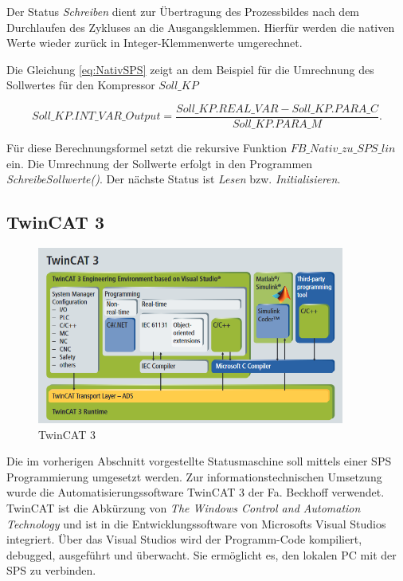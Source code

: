 Der Status \textit{Schreiben} dient zur Übertragung des Prozessbildes  nach dem Durchlaufen des Zykluses an die Ausgangsklemmen. Hierfür werden die nativen Werte wieder zurück in Integer-Klemmenwerte umgerechnet.

Die Gleichung \ref{eq:NativSPS} zeigt an dem Beispiel für die Umrechnung des Sollwertes für den Kompressor $Soll\_KP$

\begin{equation}
Soll\_KP.INT\_VAR\_Output = \frac{Soll\_KP.REAL\_VAR - Soll\_KP.PARA\_C}{Soll\_KP.PARA\_M}.
\label{eq:NativSPS} 
\end{equation}

Für diese Berechnungsformel setzt \textsc{\citeauthor{Nuerenberg2015}} die rekursive Funktion $FB\_Nativ\_zu\_SPS\_lin$ ein. Die Umrechnung der Sollwerte erfolgt in den Programmen \textit{SchreibeSollwerte()}. Der nächste Status ist \textit{Lesen} bzw. \textit{Initialisieren}.

\subsection{TwinCAT 3}
\label{subsec:TwinCat}

\begin{figure}[htb]
\centering		\includegraphics[width=0.90\textwidth]{Pictures/TwinCat3_Beckhoff.png}
\caption{TwinCAT 3 \citep{Beckhoff2016}}
\label{fig:TwinCAT}
\end{figure}


Die im vorherigen Abschnitt vorgestellte Statusmaschine soll mittels einer SPS Programmierung umgesetzt werden. Zur informationstechnischen Umsetzung wurde die Automatisierungssoftware TwinCAT 3 der Fa. Beckhoff verwendet. TwinCAT ist die Abkürzung von \textit{The Windows Control and Automation Technology} und  ist in die Entwicklungssoftware von Microsofts Visual Studios integriert. Über das Visual Studios wird der Programm-Code kompiliert, debugged, ausgeführt und überwacht. Sie ermöglicht es, den lokalen PC mit der SPS zu verbinden. 

